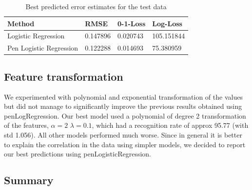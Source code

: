 \begin{table}[h!]
\begin{center}
    \begin{tabular}{ | l | l | l | p{5cm} |}
    \hline
    Method & RMSE & 0-1-Loss & Log-Loss \\ \hline
    Logistic Regression & 0.147896 & 0.020743 & 105.151844 \\ \hline
    Pen Logistic Regression & 0.122288 & 0.014693 & 75.380959 \\ \hline
    \end{tabular}
\end{center}
\caption{Best predicted error estimates for the test data}
\label{table:test_errors}
\end{table}
 

\subsection{Feature transformation}
We experimented with polynomial and exponential transformation of the values but did not manage to significantly improve the previous results obtained using penLogRegression. Our best model used a polynomial of degree 2 transformation of the features, $\alpha=2$ $\lambda=0.1$, which had a recognition rate of approx 95.77 (with std 1.056). All other models performed much worse.
Since in general it is better to explain the correlation in the data using simpler models, we decided to report our best predictions using penLogisticRegression.

\subsection{Summary}
